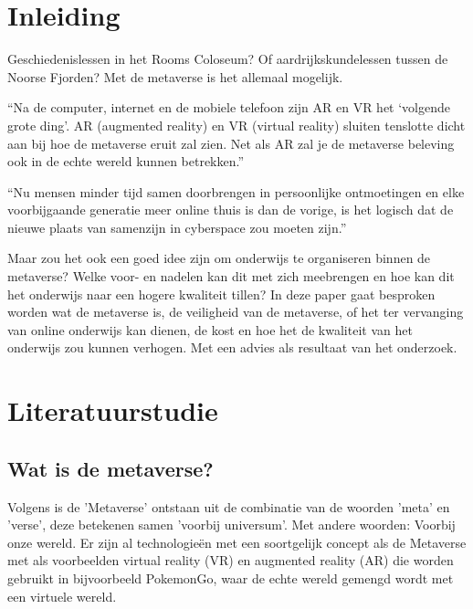 \documentclass{hogent-article}
\affiliation{
  \textsuperscript{1} \href{mailto:wout.demaeseneer@student.hogent.be}{mailto:wout.demaeseneer@student.hogent.be}}
\affiliation{
  \textsuperscript{2} \href{mailto:thibo.vanimpe@student.hogent.be}{mailto:thibo.vanimpe@student.hogent.be}
}
\begin{document}
\flushbottom %
\maketitle %
\tableofcontents %
\thispagestyle{empty} %


\section{Inleiding}
Geschiedenislessen in het Rooms Coloseum? Of aardrijkskundelessen tussen de Noorse Fjorden? Met de metaverse is het allemaal mogelijk.

``Na de computer, internet en de mobiele telefoon zijn AR en VR het ‘volgende grote ding’. AR (augmented reality) en VR (virtual reality) sluiten tenslotte dicht aan bij hoe de metaverse eruit zal zien. Net als AR zal je de metaverse beleving ook in de echte wereld kunnen betrekken.'' \autocite{Kamenov2017}

``Nu mensen minder tijd samen doorbrengen in persoonlijke ontmoetingen en elke voorbijgaande generatie meer online thuis is dan de vorige, is het logisch dat de nieuwe plaats van samenzijn in cyberspace zou moeten zijn.''\autocite{Phemex}

Maar zou het ook een goed idee zijn om onderwijs te organiseren binnen de metaverse? Welke voor- en nadelen kan dit met zich meebrengen en hoe kan dit het onderwijs naar een hogere kwaliteit tillen? In deze paper gaat besproken worden wat de metaverse is, de veiligheid van de metaverse, of het ter vervanging van online onderwijs kan dienen, de kost en hoe het de kwaliteit van het onderwijs zou kunnen verhogen. Met een advies als resultaat van het onderzoek.


\section{Literatuurstudie}
\subsection{Wat is de metaverse?}
Volgens \textcite{Phemex} is de 'Metaverse' ontstaan uit de combinatie van de woorden 'meta' en 'verse', deze betekenen samen 'voorbij universum'. Met andere woorden: Voorbij onze wereld. Er zijn al technologieën met een soortgelijk concept als de Metaverse met als voorbeelden virtual reality (VR) en augmented reality (AR) die worden gebruikt in bijvoorbeeld PokemonGo, waar de echte wereld gemengd wordt met een virtuele wereld.
\end{document}
